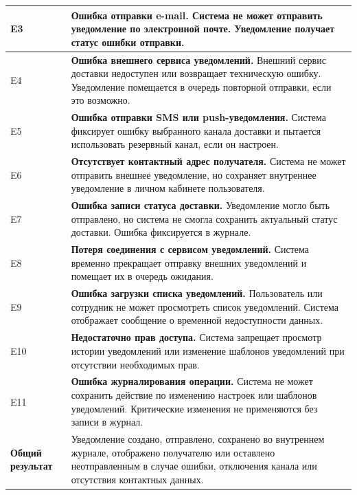 \documentclass[12pt,a4paper]{article}
\begin{document}
\begin{xltabular}{\textwidth}{
				|>{\raggedright\arraybackslash}p{2.7cm}
				|>{\raggedright\arraybackslash}X|
			}
			E3 &
			\textbf{Ошибка отправки e-mail.}
			Система не может отправить уведомление по электронной почте.
			Уведомление получает статус ошибки отправки. \\
			\hline
			
			E4 &
			\textbf{Ошибка внешнего сервиса уведомлений.}
			Внешний сервис доставки недоступен или возвращает техническую
			ошибку. Уведомление помещается в очередь повторной отправки, если
			это возможно. \\
			\hline
			
			E5 &
			\textbf{Ошибка отправки SMS или push-уведомления.}
			Система фиксирует ошибку выбранного канала доставки и пытается
			использовать резервный канал, если он настроен. \\
			\hline
			
			E6 &
			\textbf{Отсутствует контактный адрес получателя.}
			Система не может отправить внешнее уведомление, но сохраняет
			внутреннее уведомление в личном кабинете пользователя. \\
			\hline
			
			E7 &
			\textbf{Ошибка записи статуса доставки.}
			Уведомление могло быть отправлено, но система не смогла сохранить
			актуальный статус доставки. Ошибка фиксируется в журнале. \\
			\hline
			
			E8 &
			\textbf{Потеря соединения с сервисом уведомлений.}
			Система временно прекращает отправку внешних уведомлений и
			помещает их в очередь ожидания. \\
			\hline
			
			E9 &
			\textbf{Ошибка загрузки списка уведомлений.}
			Пользователь или сотрудник не может просмотреть список уведомлений.
			Система отображает сообщение о временной недоступности данных. \\
			\hline
			
			E10 &
			\textbf{Недостаточно прав доступа.}
			Система запрещает просмотр истории уведомлений или изменение
			шаблонов уведомлений при отсутствии необходимых прав. \\
			\hline
			
			E11 &
			\textbf{Ошибка журналирования операции.}
			Система не может сохранить действие по изменению настроек или
			шаблонов уведомлений. Критические изменения не применяются без
			записи в журнал. \\
			\hline
			
			
			\textbf{Общий результат} &
			Уведомление создано, отправлено, сохранено во внутреннем журнале,
			отображено получателю или оставлено неотправленным в случае ошибки,
			отключения канала или отсутствия контактных данных. \\
			\hline
			

\end{xltabular}
\end{document}

